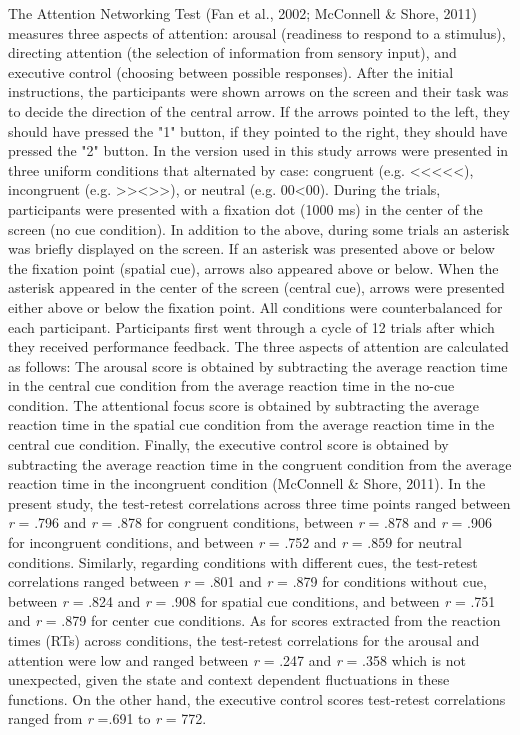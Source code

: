 \documentclass[authordate, empirical,issue]{jote-new-article}
\begin{document}
The Attention Networking Test\textbf{ }(Fan et al., 2002; McConnell \& Shore, 2011) measures three aspects of attention: arousal (readiness to respond to a stimulus), directing attention (the selection of information from sensory input), and executive control (choosing between possible responses). After the initial instructions, the participants were shown arrows on the screen and their task was to decide the direction of the central arrow. If the arrows pointed to the left, they should have pressed the "1" button, if they pointed to the right, they should have pressed the "2" button. In the version used in this study arrows were presented in three uniform conditions that alternated by case: congruent (e.g. <\null<\null<\null<\null<), incongruent (e.g. >\null>\null<\null>\null>), or neutral (e.g. 00<00). During the trials, participants were presented with a fixation dot (1000 ms) in the center of the screen (no cue condition). In addition to the above, during some trials an asterisk was briefly displayed on the screen. If an asterisk was presented above or below the fixation point (spatial cue), arrows also appeared above or below. When the asterisk appeared in the center of the screen (central cue), arrows were presented either above or below the fixation point. All conditions were counterbalanced for each participant. Participants first went through a cycle of 12 trials after which they received performance feedback. The three aspects of attention are calculated as follows: The arousal score is obtained by subtracting the average reaction time in the central cue condition from the average reaction time in the no-cue condition. The attentional focus score is obtained by subtracting the average reaction time in the spatial cue condition from the average reaction time in the central cue condition. Finally, the executive control score is obtained by subtracting the average reaction time in the congruent condition from the average reaction time in the incongruent condition (McConnell \& Shore, 2011). In the present study, the test-retest correlations across three time points ranged between \emph{r} = .796 and \emph{r} = .878 for congruent conditions, between \emph{r} = .878 and \emph{r} = .906 for incongruent conditions, and between \emph{r} = .752 and \emph{r} = .859 for neutral conditions. Similarly, regarding conditions with different cues, the test-retest correlations ranged between \emph{r} = .801 and \emph{r }= .879 for conditions without cue, between \emph{r} = .824 and \emph{r }= .908 for spatial cue conditions, and between \emph{r} = .751 and \emph{r} = .879 for center cue conditions. As for scores extracted from the reaction times (RTs) across conditions, the test-retest correlations for the arousal and attention were low and ranged between \emph{r} = .247 and \emph{r} = .358 which is not unexpected, given the state and context dependent fluctuations in these functions. On the other hand, the executive control scores test-retest correlations ranged from \emph{r} =.691 to \emph{r} = 772.
\end{document}
